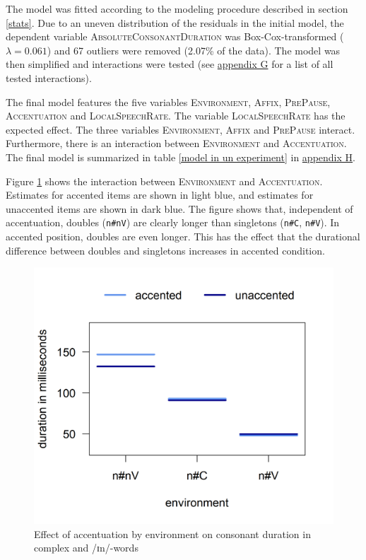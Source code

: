 The model was fitted according to the modeling procedure described in section \ref{stats}. Due to an uneven distribution of the residuals in the initial model, the dependent variable \textsc{AbsoluteConsonantDuration} was Box-Cox-transformed ($\lambda = 0.061$) and 67 outliers were removed (2.07\% of the data).
The model was then simplified and interactions were tested (see \hyperref[Appendix G Summaries of tested interactions in experimental study]{appendix G} for a list of all tested interactions).


The final model features the five variables \textsc{Environment}, \textsc{Affix}, \textsc{PrePause}, \textsc{Accentuation} and \textsc{LocalSpeechRate}. The variable \textsc{LocalSpeechRate} has the expected effect. The three variables \textsc{Environment}, \textsc{Affix} and \textsc{PrePause} interact. Furthermore, there is an interaction between \textsc{Environment} and \textsc{Accentuation}. The final model is summarized in table \ref{model in un experiment} in \hyperref[Appendix H: Model Summaries Experiment]{appendix H}.


Figure \ref{fig: Un In experiment Env and accent} shows the interaction between \textsc{Environment} and \textsc{Accentuation}. Estimates for accented items are shown in light blue, and estimates  for unaccented items are shown in dark blue. The figure shows that, independent of accentuation, doubles (\texttt{n\#nV}) are clearly longer than singletons (\texttt{n\#C}, \texttt{n\#V}). In accented position, doubles are even longer. This has the effect that the durational difference between doubles and singletons increases in accented condition.



\begin{figure} [h!]
	\centering
	\includegraphics [scale=0.5] {images/Experiment/UnInInterEnvAcc}
	\caption{Effect of accentuation by environment on consonant duration in complex  and /ɪn/-words}
	\label{fig: Un In experiment Env and accent}
\end{figure}

